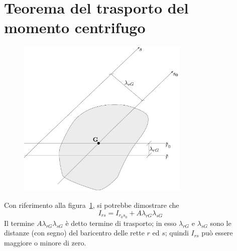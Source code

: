 \section{Teorema del trasporto del momento centrifugo}
\renewcommand{\thefigure}{3~-~5}
\begin{figure}[ht]
\centering
\includegraphics[width=0.73\textwidth]{Immagini/Parte_3/Figura3_5/Figura3_5.pdf}
\caption{}
\label{figura3-5}
\end{figure}
\noindent Con riferimento alla figura~\ref{figura3-5}, si potrebbe dimostrare che 
\begin{equation} \label{equazione3-4}
\boxed{I_{rs}=I_{r_{0}s_{0}}+A\lambda_{rG}\lambda_{sG}} \tag{3.4}
\end{equation}
Il termine $A\lambda_{rG}\lambda_{sG}$ è detto termine di trasporto; in esso $\lambda_{rG}$ e $\lambda_{sG}$ sono le distanze (con segno) del baricentro delle rette $r$ ed $s$; quindi $I_{rs}$ può essere maggiore o minore di zero. 

